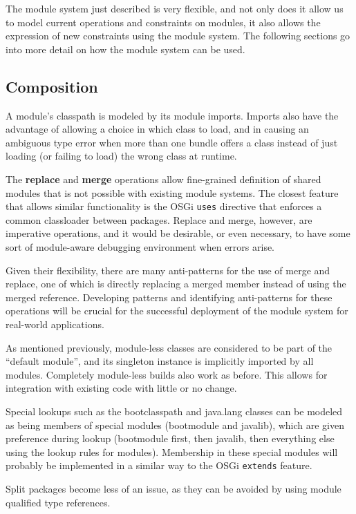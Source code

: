The module system just described is very flexible, and not only does it
allow us to model current operations and constraints on modules, it also
allows the expression of new constraints using the module system. The following
sections go into more detail on how the module system can be used.

\subsection{Composition}

A module's classpath is modeled by its module imports. Imports also have the advantage
of allowing a choice in which class to load, and in causing an
ambiguous type error  when more than one bundle offers
a class instead of just loading (or failing to load) the wrong class at runtime.

The \textbf{replace} and \textbf{merge} operations allow fine-grained
definition of shared modules that is not possible with existing
module systems. The closest feature that allows similar functionality
is the OSGi \texttt{uses} directive that enforces a common classloader
between packages. Replace and merge, however, are imperative operations, and it would
be desirable, or even necessary, to have some sort of module-aware 
debugging environment when errors arise. 

Given their flexibility,
there are many anti-patterns for the use of merge and replace, one of which
is directly replacing a merged member instead of using the merged reference.
Developing patterns and identifying anti-patterns for these operations will be
crucial for the successful deployment of the module system for real-world applications.

As mentioned previously, module-less classes are considered to be part 
of the ``default module'', and its singleton instance is implicitly 
imported by all modules. Completely module-less builds also work as before.
This allows for integration with existing code with little or no change.

Special lookups such as the bootclasspath and java.lang classes can be
modeled as being members of special modules (bootmodule and javalib), 
which are given preference during lookup (bootmodule first, then javalib,
then everything else using the lookup rules for modules). Membership
in these special modules will probably be implemented in a similar way to
the OSGi \texttt{extends} feature.

Split packages become less of an issue, as they can be 
avoided by using module qualified type references.

